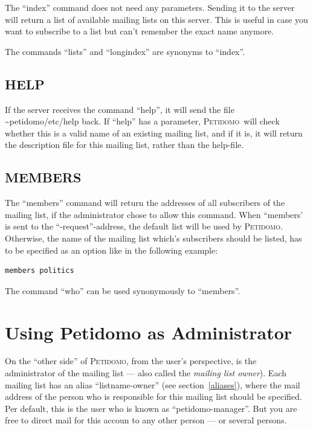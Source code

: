 \documentclass[a4paper,10pt]{scrreprt}
\newcommand{\Petidomo}{{\scshape Peti\-domo}}
\newcommand{\Def}[1]{{\sl #1}}
\newcommand{\file}[1]{{\sf #1}}
\begin{document}
The ``index'' command does not need any parameters. Sending it to the
server will return a list of available mailing lists on this server.
This is useful in case you want to subscribe to a list but can't
remember the exact name anymore.

The commands ``lists'' and ``longindex'' are synonyms to ``index''.

\section{HELP}

If the server receives the command ``help'', it will send the file
\file{\~{}peti\-domo/etc/help} back. If ``help'' has a parameter,
\Petidomo\ will check whether this is a valid name of an existing
mailing list, and if it is, it will return the description file for
this mailing list, rather than the help-file.

\section{MEMBERS}

The ``members'' command will return the addresses of all subscribers
of the mailing list, if the administrator chose to allow this command.
When ``members' is sent to the ``-request''-address, the default list
will be used by \Petidomo. Otherwise, the name of the mailing list
which's subscribers should be listed, has to be specified as an option
like in the following example:
\begin{verbatim}
members politics
\end{verbatim}

The command ``who'' can be used synonymously to ``members''.

\chapter{Using Petidomo as Administrator}
\label{petidomo as admin}

On the ``other side'' of \Petidomo, from the user's
perspective, is the administrator of the mailing list --- also called
the \Def{mailing list owner}). Each mailing list has an
alias ``listname-owner'' (see section~\ref{aliases}), where the mail
address of the person who is responsible for this mailing list should
be specified. Per default, this is the user who is known as
``petidomo-manager''. But you are free to direct mail for this accoun
to any other person --- or several persons.
\end{document}
